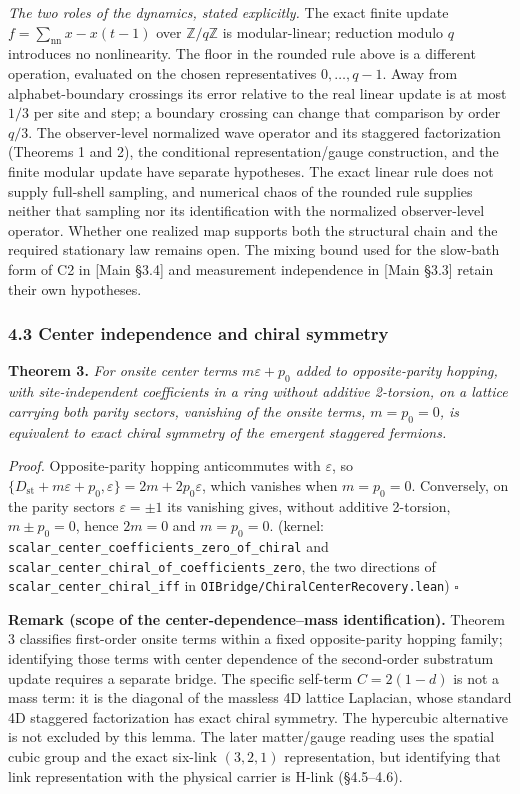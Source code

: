 \documentclass[
]{article}
\begin{document}
\emph{The two roles of the dynamics, stated explicitly.} The exact
finite update \(f=\sum_{\mathrm{nn}}x-x(t-1)\) over
\(\mathbb Z/q\mathbb Z\) is modular-linear; reduction modulo \(q\)
introduces no nonlinearity. The floor in the rounded rule above is a
different operation, evaluated on the chosen representatives
\(0,\ldots,q-1\). Away from alphabet-boundary crossings its error
relative to the real linear update is at most \(1/3\) per site and step;
a boundary crossing can change that comparison by order \(q/3\). The
observer-level normalized wave operator and its staggered factorization
(Theorems 1 and 2), the conditional representation/gauge construction,
and the finite modular update have separate hypotheses. The exact linear
rule does not supply full-shell sampling, and numerical chaos of the
rounded rule supplies neither that sampling nor its identification with
the normalized observer-level operator. Whether one realized map
supports both the structural chain and the required stationary law
remains open. The mixing bound used for the slow-bath form of C2 in
{[}Main §3.4{]} and measurement independence in {[}Main §3.3{]} retain
their own hypotheses.

\hypertarget{center-independence-and-chiral-symmetry}{%
\subsubsection{4.3 Center independence and chiral
symmetry}\label{center-independence-and-chiral-symmetry}}

\textbf{Theorem 3.} \emph{For onsite center terms \(m\varepsilon+p_0\)
added to opposite-parity hopping, with site-independent coefficients in
a ring without additive 2-torsion, on a lattice carrying both parity
sectors, vanishing of the onsite terms, \(m=p_0=0\), is equivalent to
exact chiral symmetry of the emergent staggered fermions.}

\emph{Proof.} Opposite-parity hopping anticommutes with \(\varepsilon\),
so
\(\{D_{\text{st}}+m\varepsilon+p_0,\varepsilon\}=2m+2p_0\varepsilon\),
which vanishes when \(m=p_0=0\). Conversely, on the parity sectors
\(\varepsilon=\pm1\) its vanishing gives, without additive 2-torsion,
\(m\pm p_0=0\), hence \(2m=0\) and \(m=p_0=0\). (kernel:
\texttt{scalar\_center\_coefficients\_zero\_of\_chiral} and
\texttt{scalar\_center\_chiral\_of\_coefficients\_zero}, the two
directions of \texttt{scalar\_center\_chiral\_iff} in
\texttt{OIBridge/ChiralCenterRecovery.lean}) \(\square\)

\textbf{Remark (scope of the center-dependence--mass identification).}
Theorem 3 classifies first-order onsite terms within a fixed
opposite-parity hopping family; identifying those terms with center
dependence of the second-order substratum update requires a separate
bridge. The specific self-term \(C = 2(1-d)\) is not a mass term: it is
the diagonal of the massless 4D lattice Laplacian, whose standard 4D
staggered factorization has exact chiral symmetry. The hypercubic
alternative is not excluded by this lemma. The later matter/gauge
reading uses the spatial cubic group and the exact six-link \((3,2,1)\)
representation, but identifying that link representation with the
physical carrier is H-link (§4.5--4.6).
\end{document}
